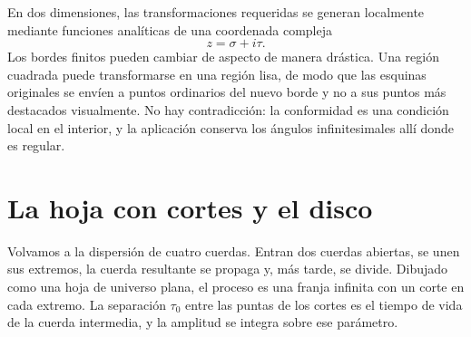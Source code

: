 \begin{classroomqa}\end{classroomqa}

En dos dimensiones, las transformaciones requeridas se generan localmente mediante funciones analíticas de una coordenada compleja \begin{equation}
  z=\sigma+i\tau.
\end{equation} Los bordes finitos pueden cambiar de aspecto de manera drástica. Una región cuadrada puede transformarse en una región lisa, de modo que las esquinas originales se envíen a puntos ordinarios del nuevo borde y no a sus puntos más destacados visualmente. No hay contradicción: la conformidad es una condición local en el interior, y la aplicación conserva los ángulos infinitesimales allí donde es regular.

\begin{classroomqa}\end{classroomqa}

\section{La hoja con cortes y el disco}

Volvamos a la dispersión de cuatro cuerdas. Entran dos cuerdas abiertas, se unen sus extremos, la cuerda resultante se propaga y, más tarde, se divide. Dibujado como una hoja de universo plana, el proceso es una franja infinita con un corte en cada extremo. La separación \(\tau_0\) entre las puntas de los cortes es el tiempo de vida de la cuerda intermedia, y la amplitud se integra sobre ese parámetro.


